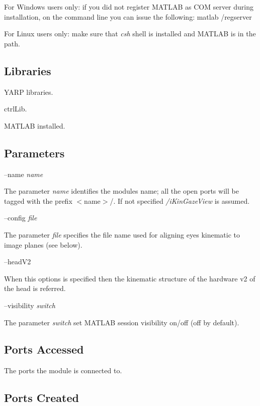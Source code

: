 For Windows users only\+: if you did not register M\+A\+T\+L\+A\+B as C\+O\+M server during installation, on the command line you can issue the following\+: matlab /regserver

For Linux users only\+: make sure that {\itshape csh} shell is installed and M\+A\+T\+L\+A\+B is in the path.\hypertarget{group__icub__tld_lib_sec}{}\subsection{Libraries}\label{group__icub__tld_lib_sec}

\begin{DoxyItemize}
\item Y\+A\+R\+P libraries.
\item ctrl\+Lib.
\item M\+A\+T\+L\+A\+B installed.
\end{DoxyItemize}\hypertarget{group__icub__tld_parameters_sec}{}\subsection{Parameters}\label{group__icub__tld_parameters_sec}
--name {\itshape name} 
\begin{DoxyItemize}
\item The parameter {\itshape name} identifies the module\textquotesingle{}s name; all the open ports will be tagged with the prefix $<$name$>$/. If not specified {\itshape /i\+Kin\+Gaze\+View} is assumed.
\end{DoxyItemize}

--config {\itshape file} 
\begin{DoxyItemize}
\item The parameter {\itshape file} specifies the file name used for aligning eyes kinematic to image planes (see below).
\end{DoxyItemize}

--head\+V2
\begin{DoxyItemize}
\item When this options is specified then the kinematic structure of the hardware v2 of the head is referred.
\end{DoxyItemize}

--visibility {\itshape switch} 
\begin{DoxyItemize}
\item The parameter {\itshape switch} set M\+A\+T\+L\+A\+B session visibility on/off (off by default).
\end{DoxyItemize}\hypertarget{group__icub__signalScope_portsa_sec}{}\subsection{Ports Accessed}\label{group__icub__signalScope_portsa_sec}
The ports the module is connected to.\hypertarget{group__icub__tld_portsc_sec}{}\subsection{Ports Created}\label{group__icub__tld_portsc_sec}

